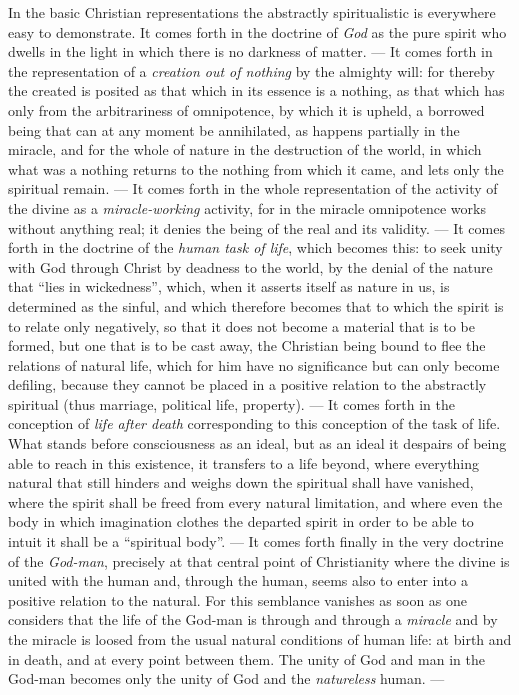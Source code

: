 \documentclass[12pt,a4paper,openany]{book}
\newcommand{\opage}[1]{\marginnote{\footnotesize\textit{[#1]}}}
\begin{document}
In the basic Christian representations the abstractly
spiritualistic is everywhere easy to demonstrate. It comes forth in the doctrine
of \emph{God} as the pure spirit who dwells in the light in which
there is no darkness of matter. --- It comes forth in the representation
of a \emph{creation out of nothing} by the almighty will:
for thereby the created is posited as that which in its essence is a
nothing, as that which has only from the arbitrariness of omnipotence, by
which it is upheld, a borrowed being that can at any
moment be annihilated, as happens partially in the miracle, and for
the whole of nature in the destruction of the world, in which what
\opage{450}was a nothing returns to the nothing from which it
came, and lets only the spiritual remain. --- It comes
forth in the whole representation of the activity of the divine
as a \emph{miracle-working} activity, for in the miracle omnipotence works
without anything real; it denies the being of the real and its
validity. --- It comes forth in the doctrine of the \emph{human
task of life}, which becomes this: to seek unity with God
through Christ by deadness to the world, by the denial
of the nature that ``lies in wickedness'', which, when
it asserts itself as nature in us, is determined as the sinful,
and which therefore becomes that to which the spirit is to relate
only negatively, so that it does not become a material that
is to be formed, but one that is to be cast away, the
Christian being bound to flee the relations of natural life, which for him
have no significance but can only become defiling,
because they cannot be placed in a positive relation to the abstractly
spiritual (thus marriage, political life, property). ---
It comes forth in the conception of \emph{life after death} corresponding
to this conception of the task of life. What stands before
consciousness as an ideal, but as an ideal it
despairs of being able to reach in this existence, it transfers
to a life beyond, where everything natural that
still hinders and weighs down the spiritual shall have vanished,
where the spirit shall be freed from every natural limitation,
and where even the body in which imagination clothes the
departed spirit in order to be able to intuit it shall be a ``spiritual
body''. --- It comes forth finally in the very doctrine of the \emph{God-man},
precisely at that central point of Christianity
where the divine is united with the human and,
through the human, seems also to enter into a positive
relation to the natural. For this semblance vanishes as soon as
one considers that the life of the God-man is through and through
a \emph{miracle} and by the miracle is loosed from the usual natural conditions
of human life: at birth and in death,
and at every point between them. The unity of God and
\opage{451}man in the God-man becomes only the unity of God and
the \emph{natureless} human. ---
\end{document}
